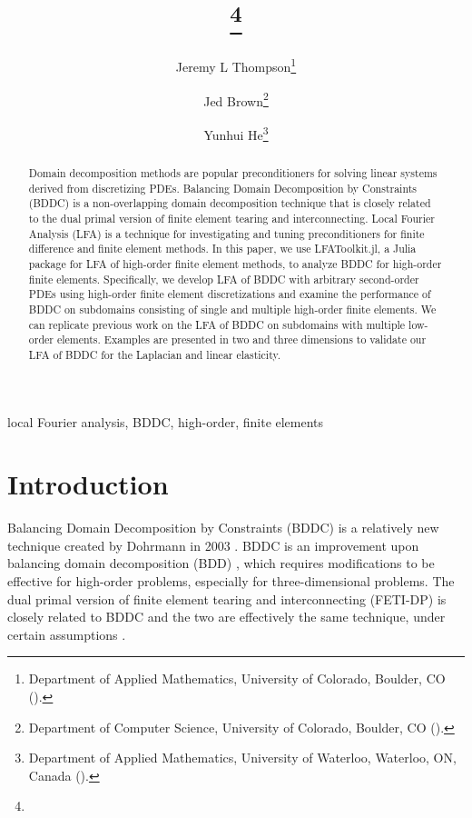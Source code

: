 \documentclass[review]{siamart190516}
\author{
  Jeremy L Thompson\thanks{Department of Applied Mathematics, University of Colorado, Boulder, CO
    (\email{jeremy@jeremylt.org}).}
  \and Jed Brown\thanks{Department of Computer Science, University of Colorado, Boulder, CO
    (\email{jed@jedbrown.org}).}
  \and Yunhui He\thanks{Department of Applied Mathematics, University of Waterloo, Waterloo, ON, Canada
    (\email{yunhui.he@uwaterloo.ca}).}
}
\title{{\TheTitle}\thanks{\TheFunding}}
\begin{document}
\maketitle

\vspace{1cm}

\begin{abstract}
Domain decomposition methods are popular preconditioners for solving linear systems derived from discretizing PDEs.
Balancing Domain Decomposition by Constraints (BDDC) is a non-overlapping domain decomposition technique that is closely related to the dual primal version of finite element tearing and interconnecting.
Local Fourier Analysis (LFA) is a technique for investigating and tuning preconditioners for finite difference and finite element methods.
In this paper, we use LFAToolkit.jl, a Julia package for LFA of high-order finite element methods, to analyze BDDC for high-order finite elements.
Specifically, we develop LFA of BDDC with arbitrary second-order PDEs using high-order finite element discretizations and examine the performance of BDDC on subdomains consisting of single and multiple high-order finite elements.
We can replicate previous work on the LFA of BDDC on subdomains with multiple low-order elements.
Examples are presented in two and three dimensions to validate our LFA of BDDC for the Laplacian and linear elasticity.
\end{abstract}

\begin{keywords}
  local Fourier analysis, BDDC, high-order, finite elements
\end{keywords}

\section{Introduction}\label{sec:intro}

Balancing Domain Decomposition by Constraints (BDDC) is a relatively new technique created by Dohrmann in 2003 \cite{dohrmann2003preconditioner}.
BDDC is an improvement upon balancing domain decomposition (BDD) \cite{mandel1993balancing}, which requires modifications to be effective for high-order problems, especially for three-dimensional problems.
The dual primal version of finite element tearing and interconnecting (FETI-DP) \cite{farhat2000scalable} is closely related to BDDC and the two are effectively the same technique, under certain assumptions \cite{mandel2007bddc}.
\end{document}
